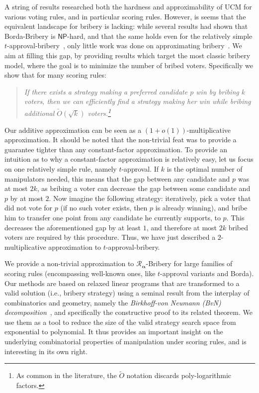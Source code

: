 \documentclass[letterpaper]{article} %
\theoremstyle{definition}
\newcommand\vecgreek{\bm}
\newcommand{\veca}{\vecgreek{\alpha}}
\newcommand{\Ra}{\mathcal{R}_{\veca}}
\newcommand{\NP}{\mathsf{NP}}
\begin{document}
A string of results researched both the hardness and approximability of UCM for various voting rules, and in particular scoring rules. However, is seems that the equivalent landscape for bribery is lacking: while several results had shown that Borda-Bribery is $\NP$-hard, and that the same holds even for the relatively simple $t$-approval-bribery~\cite{DBLP:journals/jair/FaliszewskiHH09,DBLP:conf/aaai/BrelsfordFHSS08,lin2012solving,DBLP:conf/aaai/BredereckFNT16,DBLP:journals/iandc/BredereckCFNN16}, only little work was done on approximating bribery~\cite{DBLP:conf/atal/Faliszewski08,DBLP:conf/wine/ElkindF10,DBLP:journals/iandc/BredereckCFNN16}. We aim at filling this gap, by providing  results which target the most classic bribery model, where the goal is to minimize the number of bribed voters. Specifically we show that for many scoring rules:
\begin{quotation}
	\emph{If there exists a strategy making a preferred candidate $p$ win by bribing $k$ voters, then we can \emph{efficiently} find a strategy making her win while bribing additional $\widetilde{O}(\sqrt{k})$ voters.\footnote{As common in the literature, the $\widetilde{O}$ notation discards poly-logarithmic factors.}}
\end{quotation}

Our additive approximation can be seen as a $(1+o(1))$-multiplicative approximation. It should be noted that the non-trivial feat was to provide a guarantee tighter than any constant-factor approximation. To provide an intuition as to why a constant-factor approximation is relatively easy, let us focus on one relatively simple rule, namely $t$-approval.
If $k$ is the optimal number of manipulators needed, this means that the gap between any candidate and $p$ was at most $2k$, as bribing a voter can decrease the gap between some candidate and $p$ by at most $2$. Now imagine the following strategy: iteratively, pick a voter that did not vote for $p$ (if no such voter exists, then $p$ is already winning), and bribe him to transfer one point from any candidate he currently supports, to $p$. This decreases the aforementioned gap by at least $1$, and therefore at most $2k$ bribed voters are required by this procedure. Thus, we have just described a $2$-multiplicative approximation to $t$-approval-bribery.



We provide a non-trivial approximation to $\Ra$-Bribery for large families of scoring rules (encompassing  well-known ones, like $t$-approval variants and Borda). Our methods are based on  relaxed linear programs that are transformed to a valid solution (i.e., bribery strategy) using a seminal result from the interplay of combinatorics and geometry, namely the \emph{Birkhoff-von Neumann (BvN) decomposition}~\cite{birkhoff1946tres,von1953certain,konig2001theorie}, and specifically the constructive proof to its related theorem. We use them as a tool to reduce the size of the valid strategy search space from exponential to polynomial. It thus provides an important insight on the underlying combinatorial properties of manipulation under scoring rules, and is interesting in its own right.
\end{document}
